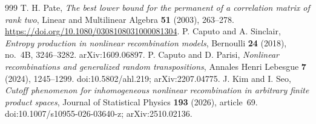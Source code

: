 \documentclass[11pt,a4paper]{article}
\theoremstyle{definition}\newtheorem{definition}[theorem]{Definition}
\theoremstyle{remark}\newtheorem{remark}[theorem]{Remark}
\numberwithin{equation}{section}
\begin{document}
\begin{thebibliography}{999}
 T. H. Pate, \emph{The best lower bound for the permanent of a correlation
matrix of rank two}, Linear and Multilinear Algebra \textbf{51} (2003),
263--278. \url{https://doi.org/10.1080/0308108031000081304}.
 P. Caputo and A. Sinclair,
\emph{Entropy production in nonlinear recombination models},
Bernoulli \textbf{24} (2018), no.~4B, 3246--3282.
arXiv:1609.06897.
 P. Caputo and D. Parisi,
\emph{Nonlinear recombinations and generalized random transpositions},
Annales Henri Lebesgue \textbf{7} (2024), 1245--1299.
doi:10.5802/ahl.219; arXiv:2207.04775.
 J. Kim and I. Seo,
\emph{Cutoff phenomenon for inhomogeneous nonlinear recombination in
arbitrary finite product spaces},
Journal of Statistical Physics \textbf{193} (2026), article~69.
doi:10.1007/s10955-026-03640-z; arXiv:2510.02136.
\end{thebibliography}
\endgroup
\end{document}
